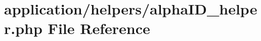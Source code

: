 \hypertarget{alpha_i_d__helper_8php}{\section{application/helpers/alpha\-I\-D\-\_\-helper.php File Reference}
\label{alpha_i_d__helper_8php}
}
